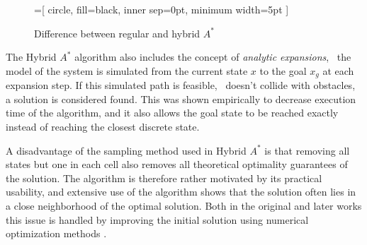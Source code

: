 \begin{figure}
    \begin{center}
        =[
            circle,
            fill=black,
            inner sep=0pt,
            minimum width=5pt
        ]
    \end{center}
    \caption{Difference between regular and hybrid $A^*$}
    \label{fig:hybrid_vs_regular}
\end{figure}

The Hybrid $A^*$ algorithm also includes the concept of \textit{analytic expansions}, \ie\ the
model of the system is simulated from the current state $x$ to the goal $x_g$ at each expansion step. If this simulated path is feasible,
\ie\  doesn't collide with obstacles, a solution is considered found. This was shown empirically to decrease execution time of the algorithm,
and it also allows the goal state to be reached exactly instead of reaching the closest discrete state.

A disadvantage of the sampling method used in Hybrid $A^*$ is that removing all states but one in each cell also removes all theoretical optimality guarantees of the solution. The algorithm is therefore rather motivated by its practical usability, and extensive use of the algorithm shows that 
the solution often lies in a close neighborhood of the optimal solution. Both in the original and later works this issue is handled 
by improving the initial solution using numerical optimization methods \cite{hybrid_astar} \cite{obstacle_optimization_hybrid}.

